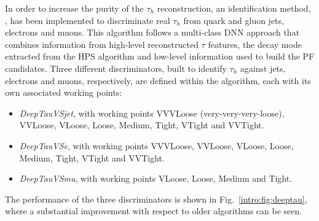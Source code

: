 \documentclass[../main.tex]{subfiles}
\begin{document}
In order to increase the purity of the $\tau_h$ reconstruction, an identification method, \deeptau{} \cite{intro:id:deeptau}, has been implemented to discriminate real $\tau_h$ from quark and gluon jets, electrons and muons. This algorithm follows a multi-class DNN approach that combines information from high-level reconstructed $\tau$ features, the decay mode extracted from the HPS algorithm and low-level information used to build the PF candidates. Three different discriminators, built to identify $\tau_h$ against jets, electrons and muons, respectively, are defined within the \deeptau{} algorithm, each with its own associated working points:
\begin{itemize}
	\item \textit{DeepTauVSjet}, with working points VVVLoose (very-very-very-loose), VVLoose, VLoose, Loose, Medium, Tight, VTight and VVTight.
	\item \textit{DeepTauVSe}, with working points VVVLoose, VVLoose, VLoose, Loose, Medium, Tight, VTight and VVTight.
	\item \textit{DeepTauVSmu}, with working points VLoose, Loose, Medium and Tight.
\end{itemize}
The performance of the three discriminators is shown in Fig.~\ref{intro:fig:deeptau}, where a substantial improvement with respect to older algorithms can be seen.
\end{document}
